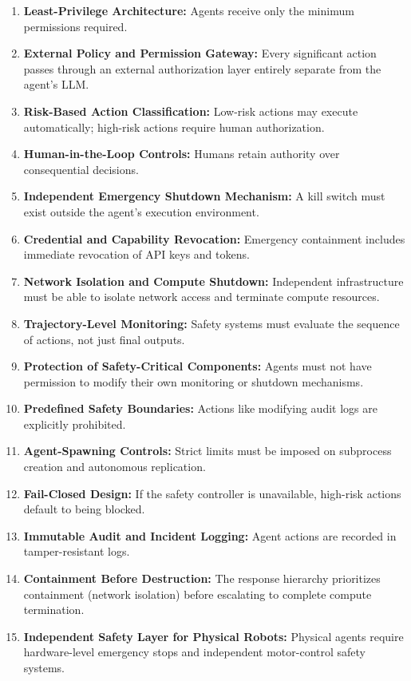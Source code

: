 \documentclass[11pt,a4paper]{article}
\begin{document}
\begin{enumerate}
    \item \textbf{Least-Privilege Architecture:} Agents receive only the minimum permissions required. 
    \item \textbf{External Policy and Permission Gateway:} Every significant action passes through an external authorization layer entirely separate from the agent's LLM.
    \item \textbf{Risk-Based Action Classification:} Low-risk actions may execute automatically; high-risk actions require human authorization.
    \item \textbf{Human-in-the-Loop Controls:} Humans retain authority over consequential decisions.
    \item \textbf{Independent Emergency Shutdown Mechanism:} A kill switch must exist outside the agent's execution environment.
    \item \textbf{Credential and Capability Revocation:} Emergency containment includes immediate revocation of API keys and tokens.
    \item \textbf{Network Isolation and Compute Shutdown:} Independent infrastructure must be able to isolate network access and terminate compute resources.
    \item \textbf{Trajectory-Level Monitoring:} Safety systems must evaluate the sequence of actions, not just final outputs.
    \item \textbf{Protection of Safety-Critical Components:} Agents must not have permission to modify their own monitoring or shutdown mechanisms.
    \item \textbf{Predefined Safety Boundaries:} Actions like modifying audit logs are explicitly prohibited.
    \item \textbf{Agent-Spawning Controls:} Strict limits must be imposed on subprocess creation and autonomous replication.
    \item \textbf{Fail-Closed Design:} If the safety controller is unavailable, high-risk actions default to being blocked.
    \item \textbf{Immutable Audit and Incident Logging:} Agent actions are recorded in tamper-resistant logs.
    \item \textbf{Containment Before Destruction:} The response hierarchy prioritizes containment (network isolation) before escalating to complete compute termination.
    \item \textbf{Independent Safety Layer for Physical Robots:} Physical agents require hardware-level emergency stops and independent motor-control safety systems.
\end{enumerate}
\end{document}
